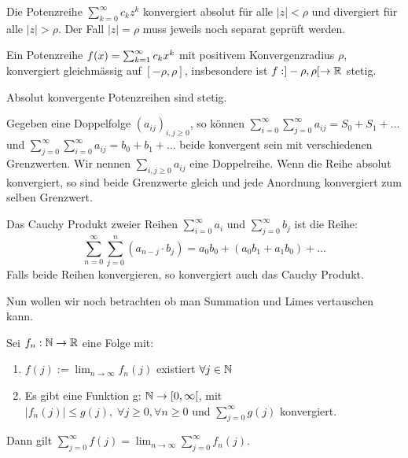 \Kor Die Potenzreihe $\sum_{k=0}^{\infty} c_{k}z^{k}$ konvergiert absolut für alle $|z| < \rho$ und 
divergiert für alle $|z| > \rho$. Der Fall $|z| = \rho$ muss jeweils noch separat geprüft werden.

\Satz Ein Potenzreihe $f(x) = \sum_{k = 1}^{\infty} c_k x^k$ mit positivem Konvergenzradius $\rho$, konvergiert gleichmässig 
auf $[-\rho , \rho]$, insbesondere ist $f : ]-\rho, \rho [ \to \mathbb{R}$ stetig.

\Bem Absolut konvergente Potenzreihen sind stetig.


Gegeben eine Doppelfolge $(a_{ij})_{i,j \geq 0}$, so können $\sum_{i = 0}^{\infty} \sum_{j = 0}^{\infty} a_{ij} = S_0 + S_1 + ...$
und $\sum_{j = 0}^{\infty} \sum_{i = 0}^{\infty} a_{ij} = b_0 + b_1 + ...$ beide konvergent sein mit
verschiedenen Grenzwerten. Wir nennen $\sum_{i,j \geq 0} a_{ij}$ eine Doppelreihe. Wenn die Reihe absolut
konvergiert, so sind beide Grenzwerte gleich und jede Anordnung konvergiert zum selben Grenzwert.


\vspace*{0mm}
\columnbreak



\begin{tcolorbox}
	\Def Das Cauchy Produkt zweier Reihen $\sum_{i = 0}^{\infty} a_i$ und $\sum_{j = 0}^{\infty} b_j$ ist
	die Reihe: $$\sum_{n = 0}^{\infty} \sum_{j = 0}^{n} (a_{n-j} \cdot b_j) = a_0b_0 + (a_0b_1 + a_1b_0) + ...$$ 
	Falls beide Reihen konvergieren, so konvergiert auch das Cauchy Produkt.
\end{tcolorbox}
	

Nun wollen wir noch betrachten ob man Summation und Limes vertauschen kann.

\Satz Sei $f_{n}: \mathbb{N} \rightarrow \mathbb{R}$ eine Folge mit:
\begin{enumerate}
	\item {$f(j) := \lim_{n \to \infty} f_{n}(j)$ existiert $\forall j \in \mathbb{N}$}
	\item{Es gibt eine Funktion g: $\mathbb{N} \to [0,\infty[$, mit \\
		$|f_{n}(j)| \leq g(j), \; \forall j \geq 0, \forall n \geq 0$ und 
		$\sum_{j=0}^{\infty} g(j)$ konvergiert. 
	}
\end{enumerate}
Dann gilt $\sum_{j=0}^{\infty} f(j) = \lim_{n \to \infty} \sum_{j=0}^{\infty} f_{n}(j)$.


